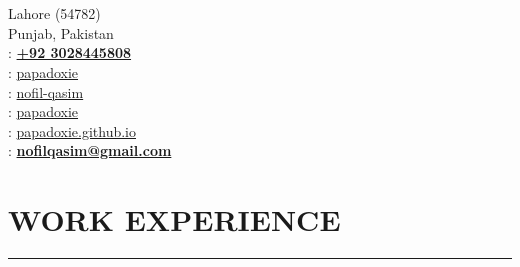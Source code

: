 \documentclass[]{resume}
\begin{document}
%
%

\hfill
\begin{minipage}[t]{0.66\textwidth}

    \vspace{-628pt}

    \hspace*{0pt}\hfill    \\
    \hspace*{0pt}\hfill    \\
    \hspace*{0pt}\hfill Lahore (54782) \\
    \hspace*{0pt}\hfill Punjab, Pakistan \\
    \hspace*{0pt}\hfill {}: \textbf{\href{tel:+923028445808}{+92 3028445808}} \\
    \hspace*{0pt}\hfill {}: \href{https://github.com/papadoxie}{papadoxie}\\
    \hspace*{0pt}\hfill {}: \href{https://linkedin.com/in/nofil-qasim}{nofil-qasim}\\
    \hspace*{0pt}\hfill {}: \href{https://tryhackme.com/p/papadoxie}{papadoxie}\\  
    \hspace*{0pt}\hfill {}: \href{https://papadoxie.github.io}{papadoxie.github.io}\\
    \hspace*{0pt}\hfill {}: \textbf{\href{mailto:nofilqasim@gmail.com}{nofilqasim@gmail.com}}



    \vspace{6.4pt}
    
    \section{WORK EXPERIENCE}
    \noindent\rule{12.80cm}{0.4pt}


\end{minipage}
\end{document}
